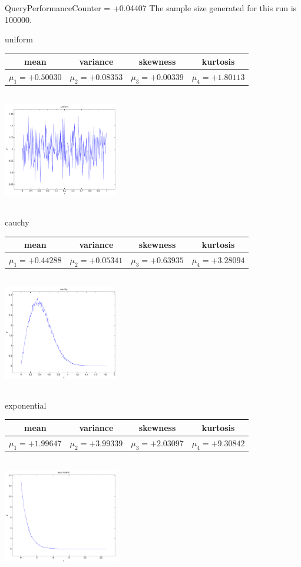 \documentclass[9pt]{article}
\theoremstyle{plain}
\theoremstyle{definition}
\theoremstyle{remark}
\numberwithin{equation}{section}
\begin{document}
QueryPerformanceCounter  =  +0.04407
The sample size generated for this run is 100000.

\newpage
uniform \begin{tabular}{|c|c|c|c|}  mean & variance & skewness & kurtosis \\  \hline
$\mu_1 = +0.50030$ & $\mu_2 = +0.08353$ & $\mu_3 = +0.00339$ & $\mu_4 =+1.80113$ \\
\end{tabular}

\includegraphics[width=5cm,height=5cm]{uniform.pdf}

cauchy \begin{tabular}{|c|c|c|c|}  mean & variance & skewness & kurtosis \\  \hline
$\mu_1 = +0.44288$ & $\mu_2 = +0.05341$ & $\mu_3 = +0.63935$ & $\mu_4 =+3.28094$ \\
\end{tabular}

\includegraphics[width=5cm,height=5cm]{cauchy.pdf}

exponential \begin{tabular}{|c|c|c|c|}  mean & variance & skewness & kurtosis \\  \hline
$\mu_1 = +1.99647$ & $\mu_2 = +3.99339$ & $\mu_3 = +2.03097$ & $\mu_4 =+9.30842$ \\
\end{tabular}

\includegraphics[width=5cm,height=5cm]{exponential.pdf}
\end{document}
